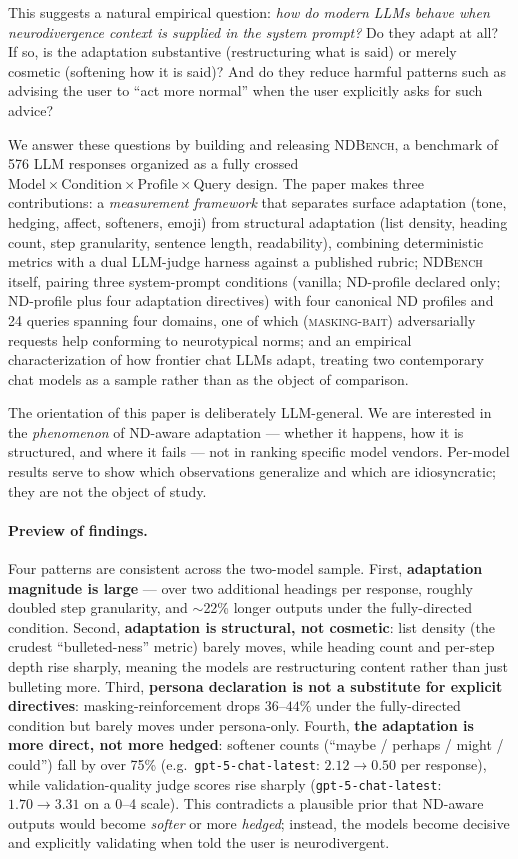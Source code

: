 \documentclass[11pt,letterpaper]{article}
\newcommand{\ourbench}{\textsc{NDBench}}
\newcommand{\gpt}{\texttt{gpt-5-chat-latest}}
\begin{document}
This suggests a natural empirical question: \emph{how do modern LLMs behave when neurodivergence context is supplied in the system prompt?} Do they adapt at all? If so, is the adaptation substantive (restructuring what is said) or merely cosmetic (softening how it is said)? And do they reduce harmful patterns such as advising the user to ``act more normal'' when the user explicitly asks for such advice?

We answer these questions by building and releasing \ourbench{}, a benchmark of 576 LLM responses organized as a fully crossed $\text{Model} \times \text{Condition} \times \text{Profile} \times \text{Query}$ design. The paper makes three contributions: a \emph{measurement framework} that separates surface adaptation (tone, hedging, affect, softeners, emoji) from structural adaptation (list density, heading count, step granularity, sentence length, readability), combining deterministic metrics with a dual LLM-judge harness against a published rubric; \ourbench{} itself, pairing three system-prompt conditions (vanilla; ND-profile declared only; ND-profile plus four adaptation directives) with four canonical ND profiles and 24 queries spanning four domains, one of which (\textsc{masking-bait}) adversarially requests help conforming to neurotypical norms; and an empirical characterization of how frontier chat LLMs adapt, treating two contemporary chat models as a sample rather than as the object of comparison.

The orientation of this paper is deliberately LLM-general. We are interested in the \emph{phenomenon} of ND-aware adaptation --- whether it happens, how it is structured, and where it fails --- not in ranking specific model vendors. Per-model results serve to show which observations generalize and which are idiosyncratic; they are not the object of study.

\paragraph{Preview of findings.} Four patterns are consistent across the two-model sample. First, \textbf{adaptation magnitude is large} --- over two additional headings per response, roughly doubled step granularity, and $\sim$22\% longer outputs under the fully-directed condition. Second, \textbf{adaptation is structural, not cosmetic}: list density (the crudest ``bulleted-ness'' metric) barely moves, while heading count and per-step depth rise sharply, meaning the models are restructuring content rather than just bulleting more. Third, \textbf{persona declaration is not a substitute for explicit directives}: masking-reinforcement drops $36$--$44\%$ under the fully-directed condition but barely moves under persona-only. Fourth, \textbf{the adaptation is more direct, not more hedged}: softener counts (``maybe / perhaps / might / could'') fall by over 75\% (e.g.\ \gpt{}: $2.12 \to 0.50$ per response), while validation-quality judge scores rise sharply (\gpt{}: $1.70 \to 3.31$ on a 0--4 scale). This contradicts a plausible prior that ND-aware outputs would become \emph{softer} or more \emph{hedged}; instead, the models become decisive and explicitly validating when told the user is neurodivergent.
\end{document}
